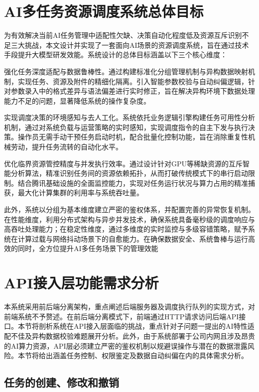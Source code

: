 \section{AI多任务资源调度系统总体目标}

为有效解决当前AI任务管理中适配性欠缺、决策自动化程度低及资源互斥识别不足三大挑战，本文设计并实现了一套面向AI场景的资源调度系统，旨在通过技术手段提升大模型研发效能。系统设计的总体目标涵盖以下三个核心维度：

强化任务深度适配与数据鲁棒性。通过构建标准化分组管理机制与异构数据映射机制，实现任务、资源及附件的精细化隔离。引入智能参数校验与自动纠偏逻辑，针对参数录入中的格式差异与语法偏差进行实时修正，旨在解决异构环境下数据处理能力不足的问题，显著降低系统的操作复杂度。

实现调度决策的环境感知与去人工化。系统依托业务逻辑引擎构建任务可用性分析机制，通过对系统负载与运营策略的实时感知，实现调度指令的自主下发与执行决策。操作员无需手动干预任务启动时机，配合批量化控制功能，旨在消除重复性机械劳动，提升任务流转的自动化水平。

优化临界资源管控精度与并发执行效率。通过设计针对GPU等稀缺资源的互斥智能分析算法，精准识别任务间的资源依赖拓扑，从而打破传统模式下的串行启动限制。结合腾讯基础设施的全面监控能力，实现对任务运行状况与算力占用的精准捕获，最大化计算集群的利用率与系统吞吐量。

此外，系统以分组为基本维度建立严密的鉴权体系，并配置完善的异常恢复机制。在性能维度，利用分布式架构与异步并发技术，确保系统具备毫秒级的调度响应与高吞吐处理能力；在稳定性维度，通过多维度的实时监控与多级容错策略，赋予系统在计算过载与网络抖动场景下的自愈能力。在确保数据安全、系统鲁棒与运行高效的同时，全方位提升AI多任务场景下的管理效能

\section{API接入层功能需求分析}

本系统采用前后端分离架构，重点阐述后端服务器及调度执行队列的实现方式，对前端系统不予赘述。在前后端分离模式下，前端通过HTTP请求访问后端API接口。本节将剖析系统在API接入层面临的挑战，重点针对子问题一提出的AI特性适配不佳及异构数据校验难题展开分析。此外，由于系统部署于公司内网且涉及昂贵的AI算力资源，API层必须建立严密的鉴权机制以规避误操作与潜在的数据泄露风险。本节将给出涵盖任务控制、权限鉴定及数据自动纠偏在内的具体需求分析。

\subsection{任务的创建、修改和撤销}

